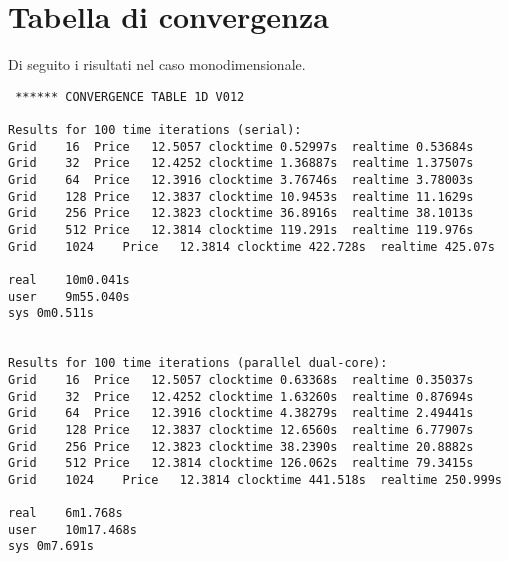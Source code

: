 \documentclass[a4paper,10pt]{article}
\begin{document}
\clearpage
\appendix
\section{Tabella di convergenza}
\label{app:conver}
Di seguito i risultati nel caso monodimensionale.
\begin{verbatim}
 ****** CONVERGENCE TABLE 1D V012

Results for 100 time iterations (serial):
Grid	16	Price	12.5057	clocktime 0.52997s	realtime 0.53684s
Grid	32	Price	12.4252	clocktime 1.36887s	realtime 1.37507s
Grid	64	Price	12.3916	clocktime 3.76746s	realtime 3.78003s
Grid	128	Price	12.3837	clocktime 10.9453s	realtime 11.1629s
Grid	256	Price	12.3823	clocktime 36.8916s	realtime 38.1013s
Grid	512	Price	12.3814	clocktime 119.291s	realtime 119.976s
Grid	1024	Price	12.3814	clocktime 422.728s	realtime 425.07s

real	10m0.041s
user	9m55.040s
sys	0m0.511s


Results for 100 time iterations (parallel dual-core):
Grid	16	Price	12.5057	clocktime 0.63368s	realtime 0.35037s
Grid	32	Price	12.4252	clocktime 1.63260s	realtime 0.87694s
Grid	64	Price	12.3916	clocktime 4.38279s	realtime 2.49441s
Grid	128	Price	12.3837	clocktime 12.6560s	realtime 6.77907s
Grid	256	Price	12.3823	clocktime 38.2390s	realtime 20.8882s
Grid	512	Price	12.3814	clocktime 126.062s	realtime 79.3415s
Grid	1024	Price	12.3814	clocktime 441.518s	realtime 250.999s

real	6m1.768s
user	10m17.468s
sys	0m7.691s

\end{verbatim}
\end{document}
